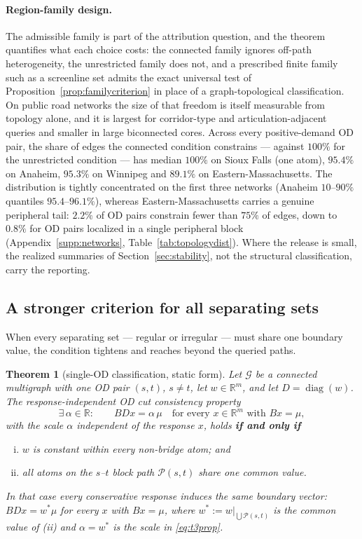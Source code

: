 \documentclass[a4paper,fleqn]{cas-sc}
\newtheorem{theorem}{Theorem}
\newcommand{\R}{\mathbb{R}}
\begin{document}
\paragraph{Region-family design.}
The admissible family is part of the attribution question, and the theorem
quantifies what each choice costs: the connected family ignores off-path
heterogeneity, the unrestricted family does not, and a prescribed finite
family such as a screenline set admits the exact universal test of
Proposition~\ref{prop:familycriterion} in place of a graph-topological
classification.
On public road networks the size of that freedom is itself measurable
from topology alone, and it is largest for corridor-type and
articulation-adjacent queries and smaller in large biconnected cores.
Across every positive-demand OD pair, the share of edges the connected
condition constrains --- against $100\%$ for the unrestricted condition
--- has median $100\%$ on Sioux Falls (one atom), $95.4\%$ on Anaheim,
$95.3\%$ on Winnipeg and $89.1\%$ on Eastern-Massachusetts. The
distribution is tightly concentrated on the first three networks
(Anaheim $10$--$90\%$ quantiles $95.4$--$96.1\%$), whereas
Eastern-Massachusetts carries a genuine peripheral tail: $2.2\%$ of OD
pairs constrain fewer than $75\%$ of edges, down to $0.8\%$ for OD
pairs localized in a single peripheral block (Appendix~\ref{supp:networks},
Table~\ref{tab:topologydist}). Where the release is small, the
realized summaries of Section~\ref{sec:stability}, not the structural
classification, carry the reporting.

\subsection{A stronger criterion for all separating sets}\label{sec:allsets}
When every separating set --- regular or irregular --- must share one
boundary value, the condition tightens and reaches beyond the queried paths.

\begin{theorem}[single-OD classification, static form]\label{thm:t3cpmain}
Let $\mathcal{G}$ be a connected multigraph with one OD pair $(s,t)$,
\textbf{$s\neq t$}, let
$w\in\R^m$, and let $D=\operatorname{diag}(w)$. The
\emph{response-independent OD cut consistency property}
\begin{equation}
\exists\,\alpha\in\R:\qquad BDx=\alpha\,\mu
\quad\text{for every }x\in\R^m\text{ with }Bx=\mu,
\label{eq:t3prop}
\end{equation}
with the scale $\alpha$ independent of the response $x$, holds
\textbf{if and only if}
\begin{enumerate}[(i)]
\item $w$ is constant within every non-bridge atom; and
\item all atoms on the $s$--$t$ block path $\mathcal{P}(s,t)$ share
one common value.
\end{enumerate}
In that case every conservative response induces the same boundary vector:
$BDx=w^*\mu$ for every $x$ with $Bx=\mu$, where
$w^*:=w|_{\bigcup\mathcal{P}(s,t)}$ is the common value of (ii) and
$\alpha=w^*$ is the scale in \eqref{eq:t3prop}.
\end{theorem}
\end{document}

